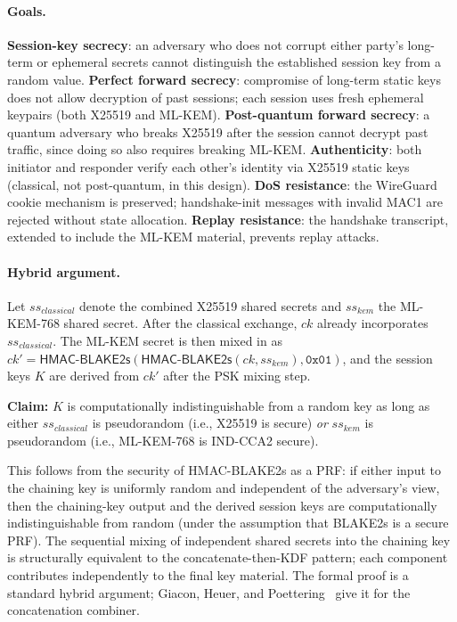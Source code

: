 \documentclass[11pt,a4paper]{article}
\begin{document}
\paragraph{Goals.} \textbf{Session-key secrecy}: an adversary who does not corrupt either party's long-term or ephemeral secrets cannot distinguish the established session key from a random value. \textbf{Perfect forward secrecy}: compromise of long-term static keys does not allow decryption of past sessions; each session uses fresh ephemeral keypairs (both X25519 and ML-KEM). \textbf{Post-quantum forward secrecy}: a quantum adversary who breaks X25519 after the session cannot decrypt past traffic, since doing so also requires breaking ML-KEM. \textbf{Authenticity}: both initiator and responder verify each other's identity via X25519 static keys (classical, not post-quantum, in this design). \textbf{DoS resistance}: the WireGuard cookie mechanism is preserved; handshake-init messages with invalid MAC1 are rejected without state allocation. \textbf{Replay resistance}: the handshake transcript, extended to include the ML-KEM material, prevents replay attacks.

\paragraph{Hybrid argument.} Let $\mathit{ss}_\mathit{classical}$ denote the combined X25519 shared secrets and $\mathit{ss}_\mathit{kem}$ the ML-KEM-768 shared secret. After the classical exchange, $\mathit{ck}$ already incorporates $\mathit{ss}_\mathit{classical}$. The ML-KEM secret is then mixed in as
$\mathit{ck}' = \mathsf{HMAC\text{-}BLAKE2s}(\mathsf{HMAC\text{-}BLAKE2s}(\mathit{ck}, \mathit{ss}_\mathit{kem}), \mathtt{0x01})$,
and the session keys $K$ are derived from $\mathit{ck}'$ after the PSK mixing step.

\textbf{Claim:} $K$ is computationally indistinguishable from a random key as long as either $\mathit{ss}_\mathit{classical}$ is pseudorandom (i.e., X25519 is secure) \emph{or} $\mathit{ss}_\mathit{kem}$ is pseudorandom (i.e., ML-KEM-768 is IND-CCA2 secure).

This follows from the security of HMAC-BLAKE2s as a PRF: if either input to the chaining key is uniformly random and independent of the adversary's view, then the chaining-key output and the derived session keys are computationally indistinguishable from random (under the assumption that BLAKE2s is a secure PRF). The sequential mixing of independent shared secrets into the chaining key is structurally equivalent to the concatenate-then-KDF pattern; each component contributes independently to the final key material. The formal proof is a standard hybrid argument; Giacon, Heuer, and Poettering~\cite{giacon2018combiners} give it for the concatenation combiner.
\end{document}
